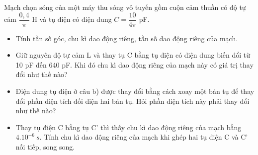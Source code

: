 \begin{vidu}
Mạch chọn sóng của một máy thu sóng vô tuyến gồm cuộn cảm thuần có độ tự cảm $\dfrac{0,4}{\pi}$ H và tụ điện có điện dung $C = \dfrac{10}{4\pi}$ pF.
\begin{itemize}
\item[a)] Tính tần số góc, chu kì dao động riêng, tần số dao động riêng của mạch.
\item[b)] Giữ nguyên độ tự cảm L và thay tụ C bằng tụ điện có điện dung biến đổi từ 10 pF đến 640 pF. Khi đó chu kì dao động riêng của mạch này có giá trị thay đổi như thế nào? 
\item[c)] Điện dung tụ điện ở câu b) được thay đổi bằng cách xoay một bản tụ để thay đổi phần diện tích đối diện hai bản tụ. Hỏi phần diện tích này phải thay đổi như thế nào?
\item[d)] Thay tụ điện C bằng tụ C' thì thấy chu kì dao động riêng của mạch bằng $4.10^{-6}\ s$. Tính chu kì dao động riêng của mạch khi ghép hai tụ điện C và C' nối tiếp, song song.
\end{itemize}
\end{vidu}
